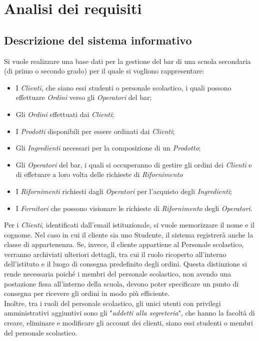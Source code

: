 \documentclass[12pt,a4paper]{article}
\begin{document}
    \section{Analisi dei requisiti}
    \subsection{Descrizione del sistema informativo}
    \label{par:Descrizione del sistema informativo}
    Si vuole realizzare una base dati per la gestione del bar di una scuola secondaria (di primo o secondo grado) per il quale si vogliono rappresentare:
    \begin{itemize}[leftmargin=1em]
        \item I \textit{Clienti}, che siano essi studenti o personale scolastico, i quali possono effettuare \textit{Ordini} verso gli \textit{Operatori} del bar;
        \item Gli \textit{Ordini} effettuati dai \textit{Clienti};
        \item I \textit{Prodotti} disponibili per essere ordinati dai \textit{Clienti};
        \item Gli \textit{Ingredienti} necessari per la composizione di un \textit{Prodotto};
        \item Gli \textit{Operatori} del bar, i quali si occuperanno di gestire gli ordini dei \textit{Clienti} e di effetuare a loro volta delle richieste di \textit{Rifornimento}
        \item I \textit{Rifornimenti} richiesti dagli \textit{Operatori} per l'acquisto degli \textit{Ingredienti};
        \item I \textit{Fornitori} che possono visionare le richieste di \textit{Rifornimento} degli \textit{Operatori}.
    \end{itemize}

    \vspace{8pt}
    \noindent
    Per i \textit{Clienti}, identificati dall'email istituzionale, si vuole memorizzare il nome e il cognome. Nel caso in cui il cliente sia uno Studente, il sistema registrerà anche la classe di appartenenza. Se, invece, il cliente appartiene al Personale scolastico, verranno archiviati ulteriori dettagli, tra cui il ruolo ricoperto all'interno dell'istituto e il luogo di consegna predefinito degli ordini. Questa distinzione si rende necessaria poiché i membri del personale scolastico, non avendo una postazione fissa all'interno della scuola, devono poter specificare un punto di consegna per ricevere gli ordini in modo più efficiente.\\
    Inoltre, tra i ruoli del personale scolastico, gli unici utenti con privilegi amministrativi aggiuntivi sono gli "\textit{addetti alla segreteria}", che hanno la facoltà di creare, eliminare e modificare gli account dei clienti, siano essi studenti o membri del personale scolastico.
\end{document}
